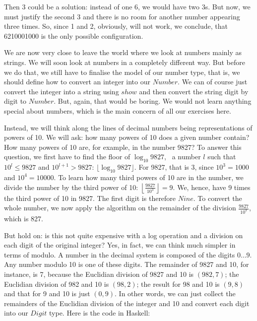\documentclass{scrreprt}
\newcommand{\Conid}[1]{\mathit{#1}}
\newcommand{\Varid}[1]{\mathit{#1}}
\begin{document}
Then 3 could be a solution:
instead of one 6, we would have two 3s.
But now, we must justify the second 3
and there is no room for another number
appearing three times.
So, since 1 and 2, obviously, will not work,
we conclude, that \num{6210001000}
is the only possible configuration.

We are now very close to leave the world
where we look at numbers mainly as strings.
We will soon look at numbers in a completely
different way.
But before we do that,
we still have to finalise the model
of our number type, that is,
we should define how to convert an integer
into our \ensuremath{\Conid{Number}}.
We can of course just convert the integer
into a string using \ensuremath{\Varid{show}}
and then convert the string digit by digit
to \ensuremath{\Conid{Number}}.
But, again, that would be boring.
We would not learn anything special
about numbers, which is the main concern
of all our exercises here.

Instead, we will think along the lines
of decimal numbers being representations
of powers of 10.
We will ask: how many powers of 10
does a given number contain?
How many powers of 10 are, for example,
in the number \num{9827}?
To answer this question,
we first have to find the floor of
$\log_{10}{9827}$, 
\ie\ a number $l$ such that 
$10^l \le 9827$ and $10^{l+1} > 9827$:
$\lfloor\log_{10}{9827}\rfloor$.
For \num{9827}, that is 3, since $10^3 = 1000$ and
$10^4 = 10000$.
To learn how many third powers of 10 are in the number,
we divide the number by the third power of 10:
$\left\lfloor \frac{9827}{10^3}\right\rfloor = 9$.
We, hence, have 9 times the third power of 10
in \num{9827}. The first digit is therefore \ensuremath{\Conid{Nine}}.
To convert the whole number,
we now apply the algorithm on the remainder 
of the division $\frac{9827}{10^3}$, which is 827.

But hold on: is this not quite expensive
with a log operation and a division on each digit of
the original integer?
Yes, in fact, we can think much simpler in terms of modulo.
A number in the decimal system is composed
of the digits $0\dots 9$.
Any number modulo 10 is one of these digits.
The remainder of \num{9827} and 10, for instance,
is 7, because the Euclidian division of \num{9827} and 10
is $(982,7)$;
the Euclidian division of 982 and 10 is $(98,2)$;
the result for 98 and 10 is $(9,8)$ and that for 9 and 10
is just $(0,9)$.
In other words, we can just collect the remainders of 
the Euclidian division of the integer and 10 and
convert each digit into our \ensuremath{\Conid{Digit}} type.
Here is the code in Haskell:
\end{document}
